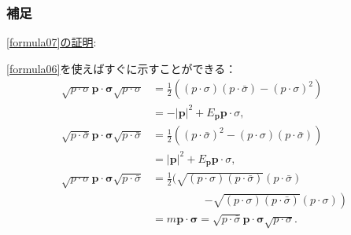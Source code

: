 \documentclass[pdflatex,unicode,ja=standard,12pt]{beamer}
\begin{document}
\begin{frame}[noframenumbering]

  \frametitle{補足 \subsecname}
  \thispagestyle{empty}

  \uline{\eqref{formula07}の証明}:

  \vspace{5pt}

  \eqref{formula06}を使えばすぐに示すことができる：
  \begin{align}
    \sqrt{p\cdot\sigma}
    \mathbf{p}\cdot\bm{\sigma}
    \sqrt{p\cdot\sigma}
    &=
    \frac{1}{2}
    \left(  
      (p\cdot\sigma)(p\cdot\bar{\sigma})
      -
      (p\cdot\sigma)^2
    \right)
    \nonumber
    \\
    &=
    -|\mathbf{p}|^2
    +
    E_{\mathbf{p}}\mathbf{p}\cdot\sigma
    ,
    \\
    \sqrt{p\cdot\bar{\sigma}}
    \mathbf{p}\cdot\bm{\sigma}
    \sqrt{p\cdot\bar{\sigma}}
    &=
    \frac{1}{2}
    \left(  
      (p\cdot\bar{\sigma})^2
      -
      (p\cdot\sigma)(p\cdot\bar{\sigma})
    \right)
    \nonumber
    \\
    &=
    |\mathbf{p}|^2
    +
    E_{\mathbf{p}}\mathbf{p}\cdot\sigma
    ,
    \\
    \sqrt{p\cdot\sigma}
    \mathbf{p}\cdot\bm{\sigma}
    \sqrt{p\cdot\bar{\sigma}}
    &=
    \frac{1}{2}
    \left.(
      \sqrt{(p\cdot\sigma)(p\cdot\bar{\sigma})}(p\cdot\bar{\sigma})
    \right.
    \nonumber
    \\
    &\hspace{2cm}
    \left.
      -
      \sqrt{(p\cdot\sigma)(p\cdot\bar{\sigma})}(p\cdot\sigma)
    \right)
    \nonumber
    \\
    &=
    m\mathbf{p}\cdot\bm{\sigma}
    =
    \sqrt{p\cdot\bar{\sigma}}
    \mathbf{p}\cdot\bm{\sigma}
    \sqrt{p\cdot\sigma}
    .
  \end{align}

\end{frame}
\end{document}
